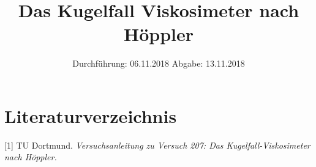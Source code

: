 

\subject{Nr. 207}
\title{Das Kugelfall Viskosimeter nach Höppler}
\date{%
  Durchführung: 06.11.2018
  \hspace{3em}
  Abgabe: 13.11.2018
}



\maketitle
\thispagestyle{empty}
\tableofcontents
\newpage






\section{Literaturverzeichnis}

[1] TU Dortmund. \textit{Versuchsanleitung zu Versuch 207: 
Das Kugelfall-Viskosimeter nach Höppler.}

\printbibliography{}


